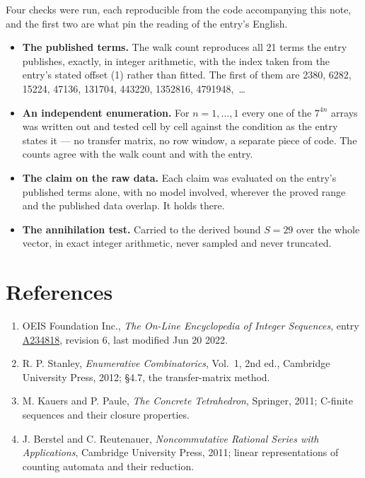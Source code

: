 \documentclass[11pt]{article}
\theoremstyle{definition}
\begin{document}
Four checks were run, each reproducible from the code accompanying this note, and the first two are what pin the reading of the entry's English.

\begin{itemize}

\item {\bfseries The published terms.} The walk count reproduces all 21 terms the entry publishes, exactly, in integer arithmetic, with the index taken from the entry's stated offset (1) rather than fitted. The first of them are 2380, 6282, 15224, 47136, 131704, 443220, 1352816, 4791948,~\dots

\item {\bfseries An independent enumeration.} For $n = 1,\dots,1$ every one of the $7^{4n}$ arrays was written out and tested cell by cell against the condition as the entry states it --- no transfer matrix, no row window, a separate piece of code. The counts agree with the walk count and with the entry.

\item {\bfseries The claim on the raw data.} Each claim was evaluated on the entry's published terms alone, with no model involved, wherever the proved range and the published data overlap. It holds there.

\item {\bfseries The annihilation test.} Carried to the derived bound $S = 29$ over the whole vector, in exact integer arithmetic, never sampled and never truncated.

\end{itemize}

\section{References}

\begin{enumerate}

\item OEIS Foundation Inc., \emph{The On-Line Encyclopedia of Integer Sequences}, entry \href{https://oeis.org/A234818}{A234818}, revision 6, last modified Jun 20 2022.

\item R. P. Stanley, \emph{Enumerative Combinatorics}, Vol.~1, 2nd ed., Cambridge University Press, 2012; \S4.7, the transfer-matrix method.

\item M. Kauers and P. Paule, \emph{The Concrete Tetrahedron}, Springer, 2011; C-finite sequences and their closure properties.

\item J. Berstel and C. Reutenauer, \emph{Noncommutative Rational Series with Applications}, Cambridge University Press, 2011; linear representations of counting automata and their reduction.

\end{enumerate}
\end{document}
